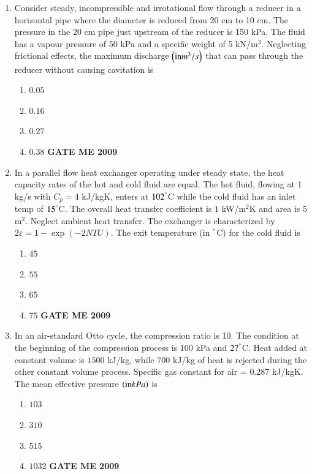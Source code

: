 \documentclass[journal]{IEEEtran}
\begin{document}
\begin{enumerate}[leftmargin=0pt]
\item Consider steady, incompressible and irrotational flow through a reducer in a horizontal pipe where the diameter is reduced from 20 cm to 10 cm. The pressure in the 20 cm pipe just upstream of the reducer is 150 kPa. The fluid has a vapour pressure of 50 kPa and a specific weight of 5 kN/m$^3$. Neglecting frictional effects, the maximum discharge $\left(\text{in} m^3/s\right)$ that can pass through the reducer without causing cavitation is
\begin{enumerate}[label=(\Alph*)]
  \item $0.05$
  \item $0.16$
  \item $0.27$
  \item $0.38$
\hfill{\textbf{GATE ME 2009}}
\end{enumerate}

\item In a parallel flow heat exchanger operating under steady state, the heat capacity rates of the hot and cold fluid are equal. The hot fluid, flowing at 1 kg/s with $C_p = 4$ kJ/kgK, enters at $102^\degree$C while the cold fluid has an inlet temp of $15^\degree$C. The overall heat transfer coefficient is $1$ kW/m$^2$K and area is 5 m$^2$. Neglect ambient heat transfer. The exchanger is characterized by $2\varepsilon = 1 - \exp(-2 NTU)$. The exit temperature (in $^\degree$C) for the cold fluid is
\begin{enumerate}[label=(\Alph*)]
  \item $45$
  \item $55$
  \item $65$
  \item $75$
\hfill{\textbf{GATE ME 2009}}
\end{enumerate}

\item In an air-standard Otto cycle, the compression ratio is 10. The condition at the beginning of the compression process is 100 kPa and $27^\degree$C. Heat added at constant volume is $1500$ kJ/kg, while $700$ kJ/kg of heat is rejected during the other constant volume process. Specific gas constant for air = $0.287$ kJ/kgK. The mean effective pressure $\left(\text{in} kPa\right)$ is
\begin{enumerate}[label=(\Alph*)]
  \item $103$
  \item $310$
  \item $515$
  \item $1032$
\hfill{\textbf{GATE ME 2009}}
\end{enumerate}


\end{enumerate}
\end{document}
